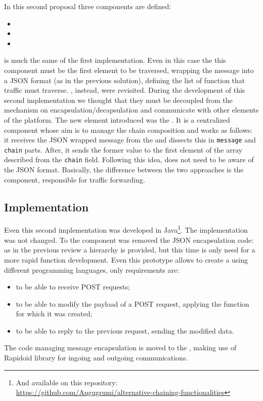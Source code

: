 In this second proposal three components are defined:
\begin{itemize}
  \item \enchainer{}
  \item \dispatcher{}
  \item \vnfs{}
\end{itemize}
\enchainer{} is much the same of the first implementation. Even in this case
the this component must be the first element to be traversed,
wrapping the message into a JSON format (as in the previous solution),
defining the
list of function that traffic must traverse. \vnfs{}, instead, were revisited.
During the development of this second implementation we thought that they must
be decoupled from the mechanism on encapsulation/decapsulation and communicate
with other elements of the platform. The
new element introduced was the \dispatcher{}. It is a centralized component
whose aim is to manage the chain composition and works as follows: it receives
the JSON wrapped message from the \enchainer{} and dissects this in 
\texttt{message} and \texttt{chain} parts. After, it sends the former
value to the first element of the array described from the \texttt{chain} field.
Following this idea, \vnfs{} does not need to be aware of the JSON format.
Basically, the difference between the two approaches is the \dispatcher{}
component, responsible for traffic forwarding.
\subsection{Implementation}
Even this second implementation was developed in Java\footnote{And
available on this repository: \\
\url{https://github.com/Augugrumi/alternative-chaining-functionalities}}. The
\enchainer{} implementation was not changed. To the \vnf{} component
was removed the JSON encapsulation code: as in the previous review a hierarchy
is provided, but this time is only need for a more rapid function development.
Even this prototype allows to create a \vnf{} using different programming languages, only requirements are:
\begin{itemize}
  \item to be able to receive POST requests;
  \item to be able to modify the payload of a POST request, applying the
  function for which it was created;
  \item to be able to reply to the previous request, sending the modified data.
\end{itemize}
The code managing message encapsulation is moved to the \dispatcher{}, making
use of
Rapidoid library for ingoing and outgoing communications.

